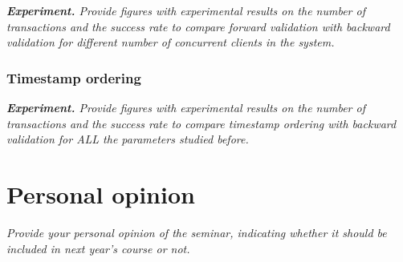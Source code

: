 \documentclass[a4paper, 10pt]{article}
\begin{document}
{\setlength{\parskip}{10pt}\noindent\textit{\textbf{Experiment.} Provide figures with experimental results on the number of transactions and the success rate to compare forward validation with backward validation for different number of concurrent clients in the system.}}

\subsubsection{Timestamp ordering}

\textit{\textbf{Experiment.} Provide figures with experimental results on the number of transactions and the success rate to compare timestamp ordering with backward validation for ALL the parameters studied before.}

\section{Personal opinion}

\textit{Provide your personal opinion of the seminar, indicating whether it should be included in next year's course or not.}
\end{document}
